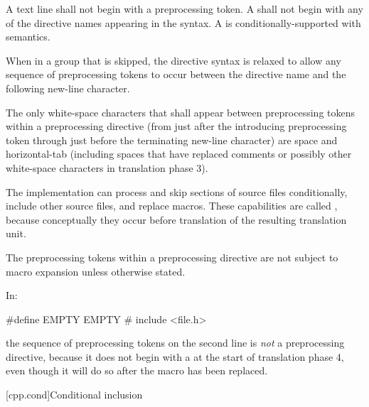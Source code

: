 \begin{bnf}
\br
\end{bnf}

\pnum
A text line shall not begin with a \tcode{\#} preprocessing token.
A  shall not begin
with any of the directive names appearing in the syntax.
A  is
conditionally-supported with
semantics.

\pnum
When in a group that is skipped, the directive
syntax is relaxed to allow any sequence of preprocessing tokens to occur between
the directive name and the following new-line character.

\pnum
The only white-space characters that shall appear
between preprocessing tokens
within a preprocessing directive
(from just after the introducing
\tcode{\#}
preprocessing token through just before the terminating new-line character)
are space and horizontal-tab
(including spaces that have replaced comments
or possibly other white-space characters
in translation phase 3).

\pnum
The implementation can
process and skip sections of source files conditionally,
include other source files,
and replace macros.
These capabilities are called
,
because conceptually they occur
before translation of the resulting translation unit.

\pnum
The preprocessing tokens within a preprocessing directive
are not subject to macro expansion unless otherwise stated.

\begin{example} In:

\begin{codeblock}
#define EMPTY
EMPTY   #   include <file.h>
\end{codeblock}

the sequence of preprocessing tokens on the second line is \textit{not}
a preprocessing directive, because it does not begin with a \tcode{\#} at the start of
translation phase 4, even though it will do so after the macro 
has been replaced.\end{example}

[cpp.cond]{Conditional inclusion}%
%

